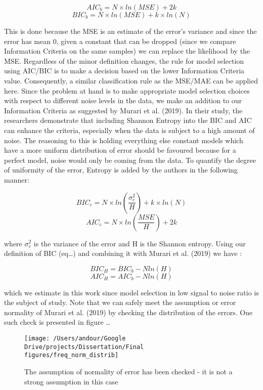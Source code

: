 \documentclass[]{article}
\begin{document}
\[AIC_b = N\times ln(MSE) + 2k\]
\[BIC_b = N \times ln(MSE) + k\times ln(N)\]

This is done because the MSE is an estimate of the error's variance and
since the error has mean 0, given a constant that can be dropped (since
we compare Information Criteria on the same samples) we can replace the
likelihood by the MSE. Regardless of the minor definition changes, the
rule for model selection using AIC/BIC is to make a decision based on
the lower Information Criteria value. Consequently, a similar
classification rule as the MSE/MAE can be applied here. Since the
problem at hand is to make appropriate model selection choices with
respect to different noise levels in the data, we make an addition to
our Information Criteria as suggested by Murari et al. (2019). In their
study, the researchers demonstrate that including Shannon Entropy into
the BIC and AIC can enhance the criteria, especially when the data is
subject to a high amount of noise. The reasoning to this is holding
everything else constant models which have a more uniform distribution
of error should be favoured because for a perfect model, noise would
only be coming from the data. To quantify the degree of uniformity of
the error, Entropy is added by the authors in the following manner:

\[BIC_c = N \times ln(\frac {\sigma_e^2}{H}) + k \times ln(N)\]
\[AIC_c = N \times ln(\frac {MSE}{H}) + 2k\]

where \(\sigma_e^2\) is the variance of the error and H is the Shannon
entropy. Using our definition of BIC (eq\ldots{}) and combining it with
Murari et al. (2019) we have :

\[BIC_H = BIC_b - Nln(H)\] \[AIC_H = AIC_b - Nln(H)\]

which we estimate in this work since model selection in low signal to
noise ratio is the subject of study. Note that we can safely meet the
assumption or error normality of Murari et al. (2019) by checking the
distribution of the errors. One such check is presented in figure
\ldots{}

\begin{figure}

{\centering \texttt{[image: /Users/andour/Google Drive/projects/Dissertation/Final figures/freq\_norm\_distrib]} 

}

\caption{The assumption of normality of error has been checked - it is not a strong assumption in this case}\label{fig:unnamed-chunk-3}
\end{figure}
\end{document}
